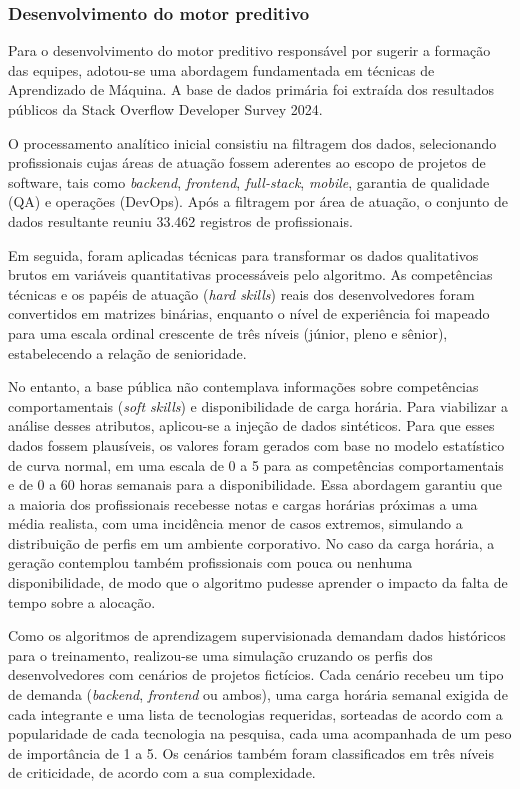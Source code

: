 \subsubsection{Desenvolvimento do motor preditivo}
Para o desenvolvimento do motor preditivo responsável por sugerir a formação das equipes, adotou-se uma abordagem fundamentada em técnicas de Aprendizado de Máquina. A base de dados primária foi extraída dos resultados públicos da Stack Overflow Developer Survey 2024.

O processamento analítico inicial consistiu na filtragem dos dados, selecionando profissionais cujas áreas de atuação fossem aderentes ao escopo de projetos de software, tais como \textit{backend}, \textit{frontend}, \textit{full-stack}, \textit{mobile}, garantia de qualidade (QA) e operações (DevOps). Após a filtragem por área de atuação, o conjunto de dados resultante reuniu 33.462 registros de profissionais.

Em seguida, foram aplicadas técnicas para transformar os dados qualitativos brutos em variáveis quantitativas processáveis pelo algoritmo. As competências técnicas e os papéis de atuação (\textit{hard skills}) reais dos desenvolvedores foram convertidos em matrizes binárias, enquanto o nível de experiência foi mapeado para uma escala ordinal crescente de três níveis (júnior, pleno e sênior), estabelecendo a relação de senioridade.

No entanto, a base pública não contemplava informações sobre competências comportamentais (\textit{soft skills}) e disponibilidade de carga horária. Para viabilizar a análise desses atributos, aplicou-se a injeção de dados sintéticos. Para que esses dados fossem plausíveis, os valores foram gerados com base no modelo estatístico de curva normal, em uma escala de 0 a 5 para as competências comportamentais e de 0 a 60 horas semanais para a disponibilidade. Essa abordagem garantiu que a maioria dos profissionais recebesse notas e cargas horárias próximas a uma média realista, com uma incidência menor de casos extremos, simulando a distribuição de perfis em um ambiente corporativo. No caso da carga horária, a geração contemplou também profissionais com pouca ou nenhuma disponibilidade, de modo que o algoritmo pudesse aprender o impacto da falta de tempo sobre a alocação.

Como os algoritmos de aprendizagem supervisionada demandam dados históricos para o treinamento, realizou-se uma simulação cruzando os perfis dos desenvolvedores com cenários de projetos fictícios. Cada cenário recebeu um tipo de demanda (\textit{backend}, \textit{frontend} ou ambos), uma carga horária semanal exigida de cada integrante e uma lista de tecnologias requeridas, sorteadas de acordo com a popularidade de cada tecnologia na pesquisa, cada uma acompanhada de um peso de importância de 1 a 5. Os cenários também foram classificados em três níveis de criticidade, de acordo com a sua complexidade.

